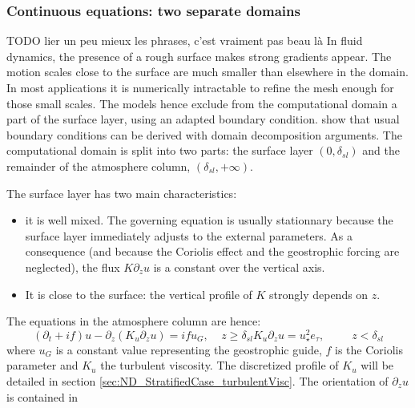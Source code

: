 \subsubsection{Continuous equations: two separate domains}
{\color{red} TODO lier un peu mieux les phrases, c'est vraiment pas beau là}
In fluid dynamics, the presence of a rough surface makes strong
gradients appear.
The motion scales close to the surface are much smaller than
elsewhere in the domain. In most applications it is numerically
intractable to refine the mesh enough for those small scales.
The models hence exclude from the computational domain
a part of the surface layer, using an adapted boundary
condition. \cite{mohammadi_rough_1998} show that usual boundary
conditions can be derived with domain decomposition arguments.
%
The computational domain is split into two parts:
the surface layer $(0,\delta_{sl})$ and the remainder of
the atmosphere column, $(\delta_{sl}, +\infty)$.
%
\par
The surface layer has two main characteristics:
\begin{itemize}
	\item it is well mixed. The governing equation
		is usually stationnary because the surface layer
		immediately adjusts to the external parameters.
		As a consequence (and because the Coriolis effect
		and the geostrophic forcing are neglected),
		the flux $K \partial_z u$
		is a constant over the vertical axis.
	\item It is close to the surface:
		the vertical profile of $K$ strongly depends 
		on $z$.
\end{itemize}
The equations in the atmosphere column are hence:
\begin{subequations}
	\label{eq:ND_NeutralCase_continuousModel}
	\begin{equation}
	\label{eq:ND_NeutralCase_EkmanEq}
  (\partial_t + if) u - \partial_z (K_u \partial_z u) = if u_G
		,~~~~~ z \geq \delta_{sl}
	\end{equation}
	\begin{equation}
	\label{eq:ND_NeutralCase_ConstantFlux}
	K_u \partial_z u
	= u_\star^2
	e_\tau, ~~~~~~~~~~~ z < \delta_{sl}
	\end{equation}
\end{subequations}
where $u_G$ is a constant value representing the geostrophic guide,
$f$ is the Coriolis parameter and $K_u$ the turbulent viscosity.
The discretized profile of $K_u$ will be
detailed in section \ref{sec:ND_StratifiedCase_turbulentVisc}.
The orientation of $\partial_z u$ is contained in
